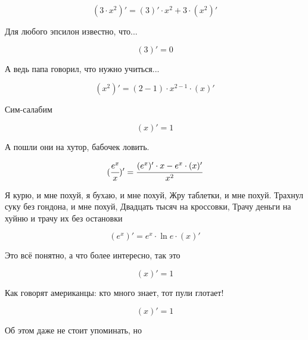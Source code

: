 \begin{dmath}
({ 3 } \cdot {{ x } ^ { 2 }})' = ( 3 )' \cdot { x } ^ { 2 } +  3  \cdot ({ x } ^ { 2 })'
\end{dmath}


Для любого эпсилон известно, что...


\begin{dmath}
( 3 )' = 0
\end{dmath}


А ведь папа говорил, что нужно учиться...


\begin{dmath}
({ x } ^ { 2 })' = {( 2  - 1) \cdot  x  ^ { 2  - 1} \cdot ( x )'}
\end{dmath}


Сим-салабим


\begin{dmath}
( x )' = 1
\end{dmath}


А пошли они на хутор, бабочек ловить.


\begin{dmath}
( \cfrac {{ e } ^ { x }}{ x })' =  \cfrac {({ e } ^ { x })' \cdot  x  - { e } ^ { x } \cdot ( x )'}{{ x } ^ 2}
\end{dmath}


Я курю, и мне похуй, я бухаю, и мне похуй, Жру таблетки, и мне похуй. Трахнул суку без гондона, и мне похуй, Двадцать тысяч на кроссовки, Трачу деньги на хуйню и трачу их без остановки


\begin{dmath}
({ e } ^ { x })' = { e } ^ { x } \cdot  \ln  e  \cdot ( x )'
\end{dmath}


Это всё понятно, а что более интересно, так это


\begin{dmath}
( x )' = 1
\end{dmath}


Как говорят американцы: кто много знает, тот пули глотает!


\begin{dmath}
( x )' = 1
\end{dmath}


Об этом даже не стоит упоминать, но


